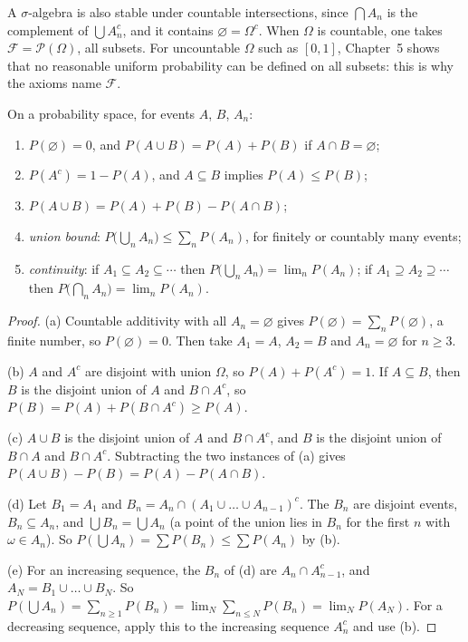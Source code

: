A $\sigma$-algebra is also stable under countable intersections, since $\bigcap A_n$ is the complement of
$\bigcup A_n^c$, and it contains $\varnothing=\Omega^c$. When $\Omega$ is countable, one takes
$\mathcal F=\mathcal P(\Omega)$, all subsets. For uncountable $\Omega$ such as $[0,1]$, Chapter~5 shows that no
reasonable uniform probability can be defined on all subsets: this is why the axioms name $\mathcal F$.

\begin{proposition}\label{prop:rules}
On a probability space, for events $A$, $B$, $A_n$:
\begin{enumerate}[label=(\alph*)]
\item $P(\varnothing)=0$, and $P(A\cup B)=P(A)+P(B)$ if $A\cap B=\varnothing$;
\item $P(A^c)=1-P(A)$, and $A\subseteq B$ implies $P(A)\le P(B)$;
\item $P(A\cup B)=P(A)+P(B)-P(A\cap B)$;
\item \emph{union bound}: $P\bigl(\bigcup_nA_n\bigr)\le\sum_nP(A_n)$, for finitely or countably many events;
\item \emph{continuity}: if $A_1\subseteq A_2\subseteq\cdots$ then $P\bigl(\bigcup_nA_n\bigr)=\lim_nP(A_n)$; if
$A_1\supseteq A_2\supseteq\cdots$ then $P\bigl(\bigcap_nA_n\bigr)=\lim_nP(A_n)$.
\end{enumerate}
\end{proposition}
\begin{proof}
(a) Countable additivity with all $A_n=\varnothing$ gives $P(\varnothing)=\sum_nP(\varnothing)$, a finite
number, so $P(\varnothing)=0$. Then take $A_1=A$, $A_2=B$ and $A_n=\varnothing$ for $n\ge3$.

(b) $A$ and $A^c$ are disjoint with union $\Omega$, so $P(A)+P(A^c)=1$. If $A\subseteq B$, then $B$ is the
disjoint union of $A$ and $B\cap A^c$, so $P(B)=P(A)+P(B\cap A^c)\ge P(A)$.

(c) $A\cup B$ is the disjoint union of $A$ and $B\cap A^c$, and $B$ is the disjoint union of $B\cap A$ and
$B\cap A^c$. Subtracting the two instances of (a) gives $P(A\cup B)-P(B)=P(A)-P(A\cap B)$.

(d) Let $B_1=A_1$ and $B_n=A_n\cap(A_1\cup\dots\cup A_{n-1})^c$. The $B_n$ are disjoint events, $B_n\subseteq A_n$,
and $\bigcup B_n=\bigcup A_n$ (a point of the union lies in $B_n$ for the first $n$ with $\omega\in A_n$). So
$P(\bigcup A_n)=\sum P(B_n)\le\sum P(A_n)$ by (b).

(e) For an increasing sequence, the $B_n$ of (d) are $A_n\cap A_{n-1}^c$, and $A_N=B_1\cup\dots\cup B_N$. So
$P(\bigcup A_n)=\sum_{n\ge1}P(B_n)=\lim_N\sum_{n\le N}P(B_n)=\lim_NP(A_N)$. For a decreasing sequence, apply this
to the increasing sequence $A_n^c$ and use (b).
\end{proof}

